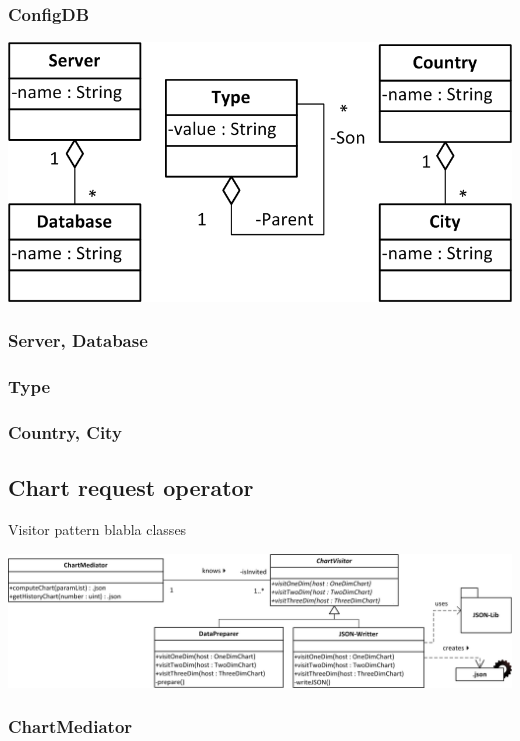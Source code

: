 \subsubsection*{ConfigDB}

\begin{center}
\includegraphics{Pictures/Parts/Strings.png}
\end{center}  
\subsubsection*{Server, Database}
\subsubsection*{Type}
\subsubsection*{Country, City}


\subsection{Chart request operator}
Visitor pattern blabla   
classes
\begin{center}
\includegraphics[width=1\linewidth]{Pictures/Parts/MediVisi.png}
\end{center}  
\subsubsection*{ChartMediator}
